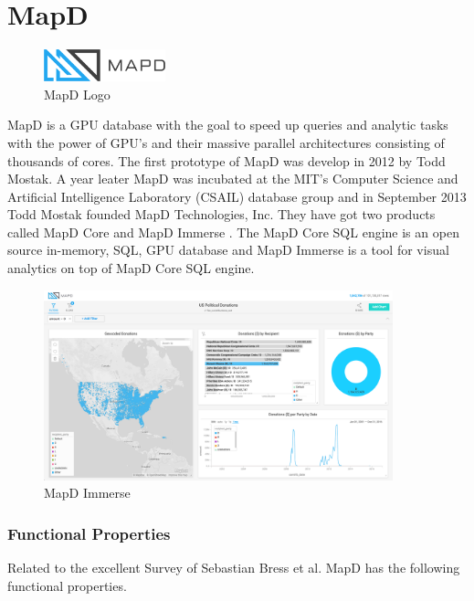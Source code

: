 \chapter{MapD}

\begin{figure}
  \begin{center}
    \includegraphics[width=100pt]{images/mapd_logo.png}
  \end{center}
  \caption[MapD]{MapD Logo}
\end{figure}


MapD is a GPU database with the goal to speed up queries and analytic tasks with the power of GPU's
and their massive parallel architectures consisting of thousands of cores.
The first prototype of MapD was develop in 2012 by Todd Mostak.
A year leater MapD was incubated at the  MIT’s Computer Science and Artificial Intelligence Laboratory (CSAIL) database group
and in September 2013 Todd Mostak founded MapD Technologies, Inc.
They have got two products called MapD Core \cite{mapdcore} and MapD Immerse \cite{immerse}.
The MapD Core SQL engine is an open source in-memory, SQL, GPU database and
MapD Immerse is a tool for visual analytics on top of MapD Core SQL engine.


\begin{figure}[H]
    \centering
    \includegraphics[width=0.9\textwidth,height=0.9\textheight,keepaspectratio]{images/mapd_imerse.png}
    \caption{MapD Immerse \cite{filtering}}
    \label{fig:immerse}
\end{figure}


\newpage
\subsection{Functional Properties}
Related to the excellent Survey of Sebastian Bress et al. \cite{bress2014gpu} MapD has the following functional properties.

